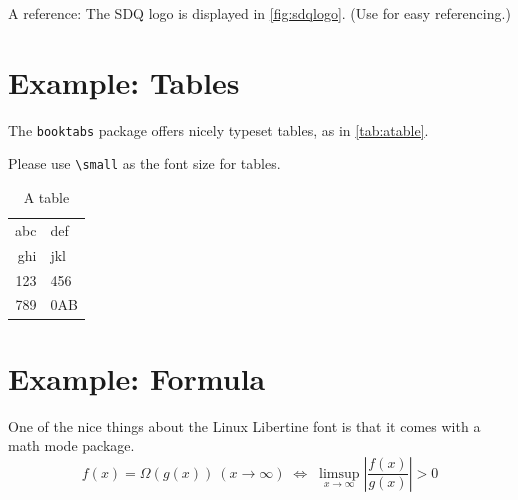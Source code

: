 A reference: The SDQ logo is displayed in \autoref{fig:sdqlogo}. 
(Use  for easy referencing.) 

\section{Example: Tables}
The \texttt{booktabs} package offers nicely typeset tables, as in \autoref{tab:atable}.

Please use \texttt{\textbackslash small} as the font size for tables.

\label{sec:Introduction:Tables}
\begin{table}
\centering\small
\begin{tabular}{r l}
\toprule
abc & def\\
ghi & jkl\\
\midrule
123 & 456\\
789 & 0AB\\
\bottomrule
\end{tabular}
\caption{A table}
\label{tab:atable}
\end{table}

\section{Example: Formula}
One of the nice things about the Linux Libertine font is that it comes with
a math mode package.
\begin{displaymath}
f(x)=\Omega(g(x))\ (x\rightarrow\infty)\;\Leftrightarrow\;
\limsup_{x \to \infty} \left|\frac{f(x)}{g(x)}\right|> 0
\end{displaymath}

